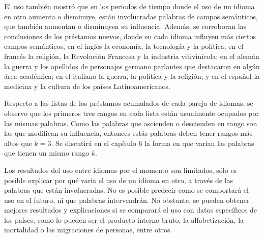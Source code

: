 El uso también mostró que en los periodos de tiempo donde el uso de un idioma en otro aumenta o disminuye, están involucradas palabras de campos semánticos, que también aumentan o disminuyen su influencia.  Además, se corroboran las conclusiones de los préstamos nuevos, donde en cada idioma influyen más ciertos campos semánticos, en el inglés la economía, la tecnología y la política; en el francés la religión, la Revolución Francesa y la industria vitivinícola; en el alemán la guerra y los apellidos de personajes germano parlantes que destacaron en algún área académica; en el italiano la guerra, la política y la religión; y en el español la medicina y la cultura de los países Latinoamericanos.

Respecto a las listas de los préstamos acumulados de cada pareja de idiomas, se observo que los primeros tres rangos en cada lista están usualmente ocupados por las mismas palabras. Como las palabras que ascienden o descienden en rango son las que modifican su influencia, entonces estás palabras deben tener rangos más altos que $k=3$. Se discutirá en el capítulo 6 la forma en que varían las palabras que tienen un mismo rango $k$.



Los resultados del uso entre idiomas por el momento son limitados, sólo es posible explicar por qué varia el uso de un idioma en otro,  a través de las palabras que están involucradas. No es posible predecir como se comportará el uso en el futuro, ni que palabras intervendrán. No obstante, se pueden obtener mejores resultados y explicaciones si se comparará el uso con datos específicos de los países, como lo pueden ser el producto interno bruto, la alfabetización, la mortalidad o  las migraciones de personas, entre otros.


 


